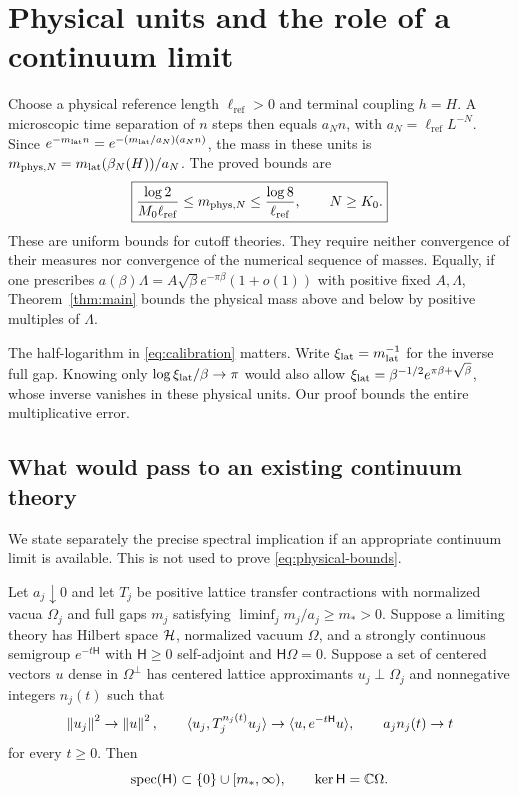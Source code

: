\section{Physical units and the role of a continuum limit}
\label{sec:physical}

Choose a physical reference length $\ell_{\mathrm{ref}}>0$ and terminal
coupling $h=H$. A microscopic time separation of $n$ steps then equals
$a_Nn$, with $a_N=\ell_{\mathrm{ref}}L^{-N}$. Since
$e^{-m_{\mathrm{lat}} n}=e^{-(m_{\mathrm{lat}}/a_N)(a_Nn)}$, the mass in these units is
$m_{{\rm phys},N}=m_{\mathrm{lat}}(\beta_N(H))/a_N$. The proved bounds are
\begin{equation}
\label{eq:physical-bounds}
 \boxed{\displaystyle
  \frac{\log2}{M_0\ell_{\mathrm{ref}}}
  \le m_{{\rm phys},N}\le\frac{\log8}{\ell_{\mathrm{ref}}},
       \qquad N\ge K_0.}
\end{equation}
These are uniform bounds for cutoff theories. They require neither
convergence of their measures nor convergence of the numerical sequence
of masses. Equally, if one prescribes
$a(\beta)\Lambda=A\sqrt\beta e^{-\pi\beta}(1+o(1))$ with positive
fixed $A,\Lambda$, Theorem~\ref{thm:main} bounds the physical mass above
and below by positive multiples of $\Lambda$.

The half-logarithm in \eqref{eq:calibration} matters. Write
$\xi_{\rm lat}=m_{\mathrm{lat}}^{-1}$ for the inverse full gap. Knowing only
$\log\xi_{\rm lat}/\beta\to\pi$ would also allow
$\xi_{\rm lat}=\beta^{-1/2}e^{\pi\beta+\sqrt\beta}$, whose inverse
vanishes in these physical units. Our proof bounds the entire
multiplicative error.

\subsection{What would pass to an existing continuum theory}

We state separately the precise spectral implication if an appropriate
continuum limit is available. This is not used to prove
\eqref{eq:physical-bounds}.

\begin{proposition}
\label{prop:continuum}
Let $a_j\downarrow0$ and let $T_j$ be positive lattice transfer
contractions with normalized vacua $\Omega_j$ and full gaps $m_j$ satisfying
$\liminf_jm_j/a_j\ge m_*>0$. Suppose a limiting theory has Hilbert
space $\mathcal H$, normalized vacuum $\Omega$, and a strongly continuous semigroup
$e^{-t\mathsf H}$ with $\mathsf H\ge0$ self-adjoint and
$\mathsf H\Omega=0$. Suppose a set of centered vectors $u$ dense in
$\Omega^\perp$ has
centered lattice approximants $u_j\perp\Omega_j$ and nonnegative
integers $n_j(t)$ such that
\[
 \left\lVert u_j\right\rVert^2\to\left\lVert u\right\rVert^2,\qquad
 \langle u_j,T_j^{n_j(t)}u_j\rangle
       \to\langle u,e^{-t\mathsf H}u\rangle,
 \qquad a_jn_j(t)\to t
\]
for every $t\ge0$. Then
\[
 \operatorname{spec}(\mathsf H)\subset\{0\}\cup[m_*,\infty),\qquad
 \ker\mathsf H=\mathbb C\Omega.
\]
\end{proposition}

